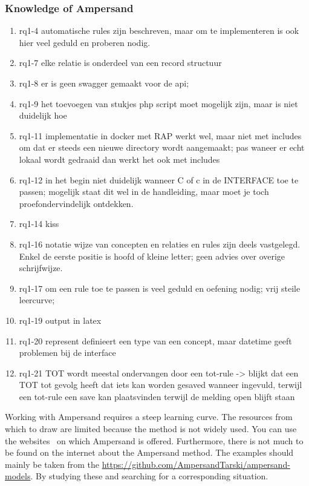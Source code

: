 \subsubsection{Knowledge of Ampersand}
\begin{comment}
plaats hier de afgehandelde items.
\end{comment}
\begin{enumerate}
    \item rq1-4 automatische rules zijn beschreven, maar om te implementeren is ook hier veel geduld en proberen nodig. 
    \item rq1-7 elke relatie is onderdeel van een record structuur
    \item rq1-8 er is geen swagger gemaakt voor de api; 
    \item rq1-9 het toevoegen van stukjes php script moet mogelijk zijn, maar is niet duidelijk hoe
    \item rq1-11 implementatie in docker met RAP werkt wel, maar niet met includes om dat er steeds een nieuwe directory wordt aangemaakt; pas waneer er echt lokaal wordt gedraaid dan werkt het ook met includes
    \item rq1-12 in het begin niet duidelijk wanneer C of c in de INTERFACE toe te passen; mogelijk staat dit wel in de handleiding, maar moet je toch proefondervindelijk ontdekken.
    \item rq1-14 kiss
    \item rq1-16 notatie wijze van concepten en relaties en rules zijn deels vastgelegd. Enkel de eerste positie is hoofd of kleine letter; geen advies over overige schrijfwijze.
    \item rq1-17 om een rule toe te passen is veel geduld en oefening nodig; vrij steile leercurve; 
    \item rq1-19 output in latex 
    \item rq1-20 represent definieert een type van een concept, maar datetime geeft problemen bij de interface
    \item rq1-21 TOT wordt meestal ondervangen door een tot-rule -> blijkt dat een TOT tot gevolg heeft dat iets kan worden gesaved wanneer ingevuld, terwijl een tot-rule een save kan plaatsvinden terwijl de melding open blijft staan
\end{enumerate}

Working with Ampersand requires a steep learning curve.
The resources from which to draw are limited because the method is not widely used.
You can use the websites~\footnotemark{} on which Ampersand is offered.
Furthermore, there is not much to be found on the internet about the Ampersand method.
The examples should mainly be taken from the \url{https://github.com/AmpersandTarski/ampersand-models}.
By studying these and searching for a corresponding situation.

